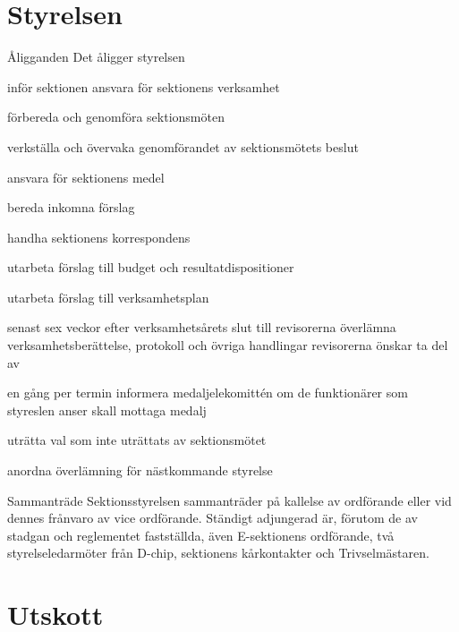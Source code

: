 \documentclass[pdfbookmarks,a4paper,11pt]{article}
\newlength{\itemcollength}
\newenvironment{reglemlista}{%
  \begin{list}{}{%
      \setlength{\labelwidth}{\itemcollength}%
      \setlength{\leftmargin}{\labelwidth + \labelsep}%
      \renewcommand{\makelabel}[1]{%
        \raisebox{0pt}[1ex][0pt]{%
          \makebox[\labelwidth][l]{%
            \parbox[t]{\itemcollength}{%
              \raggedright\hspace{0pt}##1}}}\hfill}%
      }}{%
  \end{list}}
\begin{document}
\section{Styrelsen}

\begin{reglemlista}

	\item[Åligganden]
	Det åligger styrelsen
	\begin{attlista}
		\item inför sektionen ansvara för sektionens verksamhet
		\item förbereda och genomföra sektionsmöten
		\item verkställa och övervaka genomförandet av sektionsmötets beslut
		\item ansvara för sektionens medel
		\item bereda inkomna förslag
		\item handha sektionens korrespondens
		\item utarbeta förslag till budget och resultatdispositioner
		\item utarbeta förslag till verksamhetsplan
		\item senast sex veckor efter verksamhetsårets slut till revisor\-erna överlämna verksamhetsberättelse, protokoll och övriga handlingar revisorerna önskar ta del av
		\item en gång per termin informera medaljelekomittén om de funktionärer som styreslen anser skall mottaga medalj
		\item uträtta val som inte uträttats av sektionsmötet
		\item anordna överlämning för nästkommande styrelse
	\end{attlista}

	\item[Sammanträde]
	Sektionsstyrelsen sammanträder på kallelse av ordförande eller vid dennes frånvaro av vice ordförande. Ständigt adjungerad
är, förutom de av stadgan och reglementet fastställda, även E-sektionens ordförande, två styrelseledarmöter från D-chip, sektionens kårkontakter och Trivselmästaren.

\end{reglemlista}

\section{Utskott}
\end{document}
